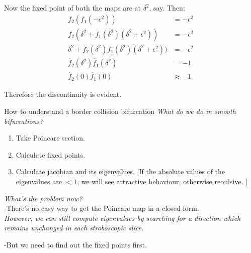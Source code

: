 \documentclass[xcolor=x11names,compress]{beamer}
\renewcommand{\(}{\begin{columns}}
\renewcommand{\)}{\end{columns}}
\newcommand{\<}[1]{\begin{column}{#1}}
\renewcommand{\>}{\end{column}}
\begin{document}
\begin{frame}
Now the fixed point of both the maps are at $\delta^2$, say.    
Then: 
\begin{align*}
f_2(f_1(-\epsilon^2))&=-\epsilon^2\\
f_2(\delta^2+\dot{f_1}(\delta^2)(\delta^2+\epsilon^2))&=-\epsilon^2\\
\delta^2+\dot{f_2}(\delta^2)\dot{f_1}(\delta^2)(\delta^2+\epsilon^2))&=-\epsilon^2\\
\dot{f_2}(\delta^2)\dot{f_1}(\delta^2)&=-1\\
\dot{f_2}(0)\dot{f_1}(0)&\approx-1
\end{align*}

Therefore the discontinuity is evident.  
\end{frame}


\begin{frame}{How to understand a border collision bifurcation}
\emph{What do we do in smooth bifurcations?}
\begin{enumerate}
\item Take Poincare section.  
\item Calculate fixed points.  
\item Calculate jacobian and its eigenvalues.  
[If the absolute values of the eigenvalues are $<1$, we will see attractive 
behaviour, otherwise reoulsive.  ]
\end{enumerate}


\emph{What's the problem now?}\\

-There's no easy way to get the Poincare map in a closed form.  \\
\vspace{1em}
\emph{However, we can still compute eigenvalues by searching for a direction 
which remains unchanged in each stroboscopic slice.}

-But we need to find out the fixed points first.  
\end{frame}
\end{document}
